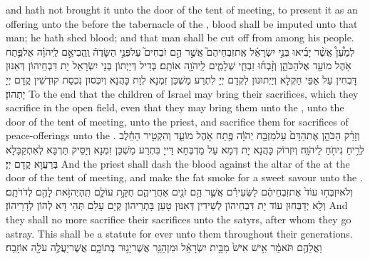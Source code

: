 {and hath not brought it unto the door of the tent of meeting, to present it as an offering unto the \lord\space before the tabernacle of the \lord, blood shall be imputed unto that man; he hath shed blood; and that man shall be cut off from among his people.}{}
{לְמַ֩עַן֩ אֲשֶׁ֨ר יָבִ֜יאוּ בְּנֵ֣י יִשְׂרָאֵ֗ל אֶֽת\maqqaf זִבְחֵיהֶם֮ אֲשֶׁ֣ר הֵ֣ם זֹבְחִים֮ עַל\maqqaf פְּנֵ֣י הַשָּׂדֶה֒ וֶֽהֱבִיאֻ֣ם לַֽיהֹוָ֗ה אֶל\maqqaf פֶּ֛תַח אֹ֥הֶל מוֹעֵ֖ד אֶל\maqqaf הַכֹּהֵ֑ן וְזָ֨בְח֜וּ זִבְחֵ֧י שְׁלָמִ֛ים לַֽיהֹוָ֖ה אוֹתָֽם׃}
{בְּדִיל דְּיַיְתוֹן בְּנֵי יִשְׂרָאֵל יָת דִּבְחֵיהוֹן דְּאִנּוּן דָּבְחִין עַל אַפֵּי חַקְלָא וְיַיְתוּנוּן לִקְדָם יְיָ לִתְרַע מַשְׁכַּן זִמְנָא לְוָת כָּהֲנָא וְיִכְּסוּן נִכְסַת קוּדְשִׁין קֳדָם יְיָ יָתְהוֹן׃}
{To the end that the children of Israel may bring their sacrifices, which they sacrifice in the open field, even that they may bring them unto the \lord, unto the door of the tent of meeting, unto the priest, and sacrifice them for sacrifices of peace-offerings unto the \lord.}{}
{וְזָרַ֨ק הַכֹּהֵ֤ן אֶת\maqqaf הַדָּם֙ עַל\maqqaf מִזְבַּ֣ח יְהֹוָ֔ה פֶּ֖תַח אֹ֣הֶל מוֹעֵ֑ד וְהִקְטִ֣יר הַחֵ֔לֶב לְרֵ֥יחַ נִיחֹ֖חַ לַיהֹוָֽה׃}
{וְיִזְרוֹק כָּהֲנָא יָת דְּמָא עַל מַדְבְּחָא דַּייָ בִּתְרַע מַשְׁכַּן זִמְנָא וְיַסֵּיק תַּרְבָּא לְאִתְקַבָּלָא בְּרַעֲוָא קֳדָם יְיָ׃}
{And the priest shall dash the blood against the altar of the \lord\space at the door of the tent of meeting, and make the fat smoke for a sweet savour unto the \lord.}{}
{וְלֹא\maqqaf יִזְבְּח֥וּ עוֹד֙ אֶת\maqqaf זִבְחֵיהֶ֔ם לַשְּׂעִירִ֕ם אֲשֶׁ֛ר הֵ֥ם זֹנִ֖ים אַחֲרֵיהֶ֑ם חֻקַּ֥ת עוֹלָ֛ם תִּֽהְיֶה\maqqaf זֹּ֥את לָהֶ֖ם לְדֹרֹתָֽם׃}
{וְלָא יְדַבְּחוּן עוֹד יָת דִּבְחֵיהוֹן לְשֵׁידִין דְּאִנּוּן טָעַן בָּתְרֵיהוֹן קְיָם עָלַם תְּהֵי דָּא לְהוֹן לְדָרֵיהוֹן׃}
{And they shall no more sacrifice their sacrifices unto the satyrs, after whom they go astray. This shall be a statute for ever unto them throughout their generations.}{}
{וַאֲלֵהֶ֣ם תֹּאמַ֔ר אִ֥ישׁ אִישׁ֙ מִבֵּ֣ית יִשְׂרָאֵ֔ל וּמִן\maqqaf הַגֵּ֖ר אֲשֶׁר\maqqaf יָג֣וּר בְּתוֹכָ֑ם אֲשֶׁר\maqqaf יַעֲלֶ֥ה עֹלָ֖ה אוֹ\maqqaf זָֽבַח׃}
